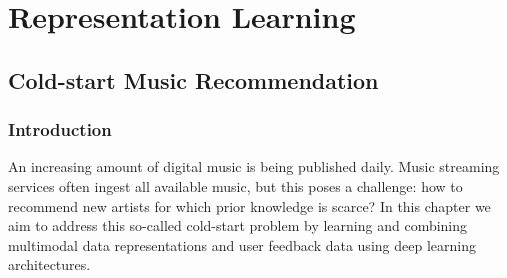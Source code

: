 
\part{Representation Learning}
\label{part:multimodal-deep}

\chapter{Cold-start Music Recommendation}
\label{sec:cold-rec}

\section{Introduction}\label{sec:cold-rec:intro}
\label{sec:cold-rec:intro}



An increasing amount of digital music is being published daily. Music streaming services often ingest all available music, but this poses a challenge: how to recommend new artists for which prior knowledge is scarce? In this chapter we aim to address this so-called cold-start problem by learning and combining multimodal data representations and user feedback data using deep learning architectures. 


